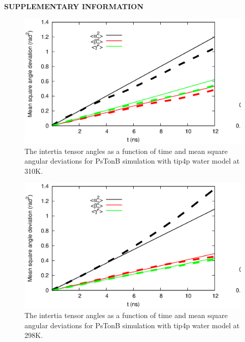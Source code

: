 \documentclass[pre,aps,floatfix,authordate1-4,twocolumn]{revtex4-1}
\begin{document}
\begin{center}
{\bf SUPPLEMENTARY INFORMATION}
\end{center}
\begin{figure}[!h]
  \includegraphics[width=16.5cm]{../Figs/RMASDplotPsTonBtip4pT310K.eps}%
  \caption{The intertia tensor angles as a function of time and mean square angular
    deviations for PsTonB simulation with tip4p water model at 310K.
    \label{RMASDplotLOG310}}%
\end{figure}
\begin{figure}[!h]
  \includegraphics[width=16.5cm]{../Figs/RMASDplotPsTonBtip4pT298K.eps}%
  \caption{The intertia tensor angles as a function of time and mean square angular
    deviations for PsTonB simulation with tip4p water model at 298K.
    \label{RMASDplotLOG298}}%
\end{figure}


\end{document}
